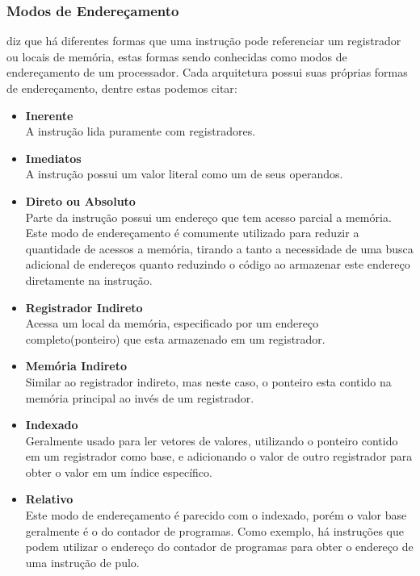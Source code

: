 \documentclass[
	12pt,				%
	openright,			%
	oneside,			%
	a4paper,			%
	english,			%
	french,				%
	spanish,			%
	brazil,				%
	]{abntex2}
\begin{document}
\subsubsection{Modos de Endereçamento}
 diz que há diferentes formas que uma instrução pode referenciar um registrador ou locais de memória, estas formas sendo conhecidas como modos de endereçamento de um processador. Cada arquitetura possui suas próprias formas de endereçamento, dentre estas podemos citar\cite[p.75]{patterson_computer_1996}\cite{catsoulis_designing_2002}:
\begin{itemize}
    \item \textbf{Inerente}\\
    A instrução lida puramente com registradores.
    \item \textbf{Imediatos}\\
    A instrução possui um valor literal como um de seus operandos.
    \item \textbf{Direto ou Absoluto}\\
    Parte da instrução possui um endereço que tem acesso parcial a memória. Este modo de endereçamento é comumente utilizado para reduzir a quantidade de acessos a memória, tirando a tanto a necessidade de uma busca adicional de endereços quanto reduzindo o código ao armazenar este endereço diretamente na instrução.
    \item \textbf{Registrador Indireto}\\
    Acessa um local da memória, especificado por um endereço completo(ponteiro) que esta armazenado em um registrador.
    \item \textbf{Memória Indireto}\\
    Similar ao registrador indireto, mas neste caso, o ponteiro esta contido na memória principal ao invés de um registrador.
    \item  \textbf{Indexado}\\
    Geralmente usado para ler vetores de valores, utilizando o ponteiro contido em um registrador como base, e adicionando o valor de outro registrador para obter o valor em um índice específico.
    \item \textbf{Relativo}\\
    Este modo de endereçamento é parecido com o indexado, porém o valor base geralmente é o do contador de programas. Como exemplo, há instruções que podem utilizar o endereço do contador de programas para obter o endereço de uma instrução de pulo.
    
\end{itemize}
\end{document}
